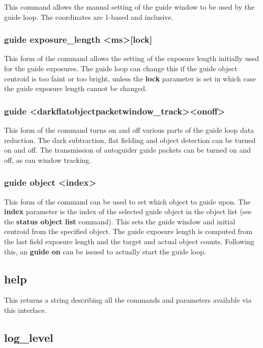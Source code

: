 \documentclass[10pt,a4paper]{article}
\begin{document}
This command allows the manual setting of the guide window to be used by the guide loop. The coordinates are 1-based and inclusive. 

\subsubsection{guide exposure\_length \textless ms\textgreater  [lock]}

This form of the command allows the setting of the exposure length initially used for the guide exposures. The guide loop can change this if the guide object centroid is too faint or too bright, unless the {\bf lock} parameter is set in which case the guide exposure length cannot be changed.

\subsubsection{guide \textless dark\textbar flat\textbar object\textbar packet\textbar window\_track\textgreater  \textless on\textbar off\textgreater}

This form of the command turns on and off various parts of the guide loop data reduction. The dark subtraction, flat fielding and object detection can be turned on and off. The transmission of autoguider guide packets can be turned on and off, as can window tracking.

\subsubsection{guide object \textless index\textgreater}

This form of the command can be used to set which object to guide upon. The {\bf index} parameter is the index of the selected guide object in the object list (see the {\bf status object list} command). This sets the guide window and initial centroid from the specified object. The guide exposure length is computed from the last field exposure length and the target and actual object counts. Following this, an {\bf guide on} can be issued to actually start the guide loop. 

\subsection{help}

This returns a string describing all the commands and parameters available via this interface.

\subsection{log\_level}
\end{document}
